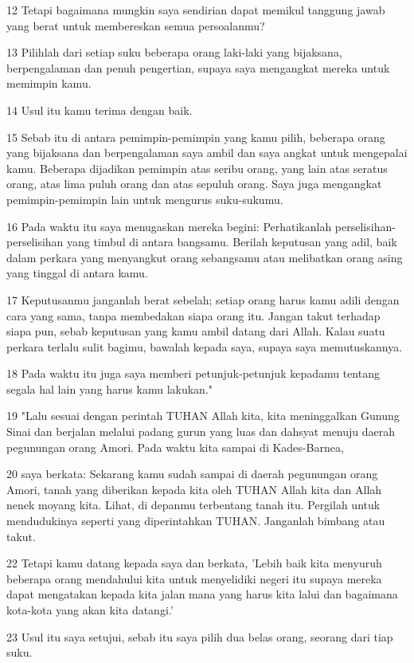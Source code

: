 \par 12 Tetapi bagaimana mungkin saya sendirian dapat memikul tanggung jawab yang berat untuk membereskan semua persoalanmu?
\par 13 Pilihlah dari setiap suku beberapa orang laki-laki yang bijaksana, berpengalaman dan penuh pengertian, supaya saya mengangkat mereka untuk memimpin kamu.
\par 14 Usul itu kamu terima dengan baik.
\par 15 Sebab itu di antara pemimpin-pemimpin yang kamu pilih, beberapa orang yang bijaksana dan berpengalaman saya ambil dan saya angkat untuk mengepalai kamu. Beberapa dijadikan pemimpin atas seribu orang, yang lain atas seratus orang, atas lima puluh orang dan atas sepuluh orang. Saya juga mengangkat pemimpin-pemimpin lain untuk mengurus suku-sukumu.
\par 16 Pada waktu itu saya menugaskan mereka begini: Perhatikanlah perselisihan-perselisihan yang timbul di antara bangsamu. Berilah keputusan yang adil, baik dalam perkara yang menyangkut orang sebangsamu atau melibatkan orang asing yang tinggal di antara kamu.
\par 17 Keputusanmu janganlah berat sebelah; setiap orang harus kamu adili dengan cara yang sama, tanpa membedakan siapa orang itu. Jangan takut terhadap siapa pun, sebab keputusan yang kamu ambil datang dari Allah. Kalau suatu perkara terlalu sulit bagimu, bawalah kepada saya, supaya saya memutuskannya.
\par 18 Pada waktu itu juga saya memberi petunjuk-petunjuk kepadamu tentang segala hal lain yang harus kamu lakukan."
\par 19 "Lalu sesuai dengan perintah TUHAN Allah kita, kita meninggalkan Gunung Sinai dan berjalan melalui padang gurun yang luas dan dahsyat menuju daerah pegunungan orang Amori. Pada waktu kita sampai di Kades-Barnea,
\par 20 saya berkata: Sekarang kamu sudah sampai di daerah pegunungan orang Amori, tanah yang diberikan kepada kita oleh TUHAN Allah kita dan Allah nenek moyang kita. Lihat, di depanmu terbentang tanah itu. Pergilah untuk mendudukinya seperti yang diperintahkan TUHAN. Janganlah bimbang atau takut.
\par 22 Tetapi kamu datang kepada saya dan berkata, 'Lebih baik kita menyuruh beberapa orang mendahului kita untuk menyelidiki negeri itu supaya mereka dapat mengatakan kepada kita jalan mana yang harus kita lalui dan bagaimana kota-kota yang akan kita datangi.'
\par 23 Usul itu saya setujui, sebab itu saya pilih dua belas orang, seorang dari tiap suku.
